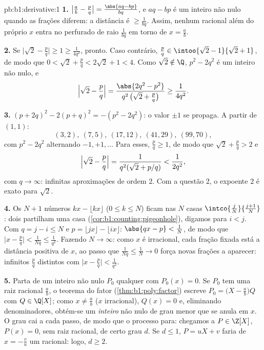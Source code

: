 \begin{solution}{pb:b1:derivative:1}
\textbf{1.} $\bigl|\frac ab - \frac pq\bigr| = \frac{\abs{aq -
bp}}{bq}$, e $aq - bp$ é um inteiro não nulo quando as frações
diferem: a distância é $\geq \frac{1}{bq}$. Assim, nenhum racional
além do próprio $x$ entra no  perfurado de raio
$\frac{1}{bq}$ em torno de $x = \frac ab$.

\textbf{2.} Se $\bigl|\sqrt2 - \frac pq\bigr| \geq 1 \geq
\frac{1}{4q^2}$, pronto. Caso contrário, $\frac pq \in \intoo{\sqrt2 -
1}{\sqrt2 + 1}$, de modo que $0 < \sqrt2 + \frac pq < 2\sqrt2 + 1 < 4$.
Como $\sqrt 2 \notin \Q$, $p^2 - 2q^2$ é um inteiro não nulo, e
\[
\Bigl|\sqrt2 - \frac pq\Bigr|
= \frac{\abs{2q^2 - p^2}}{q^2\,\bigl(\sqrt2 + \frac pq\bigr)}
\geq \frac{1}{4q^2} .
\]

\textbf{3.} $(p + 2q)^2 - 2(p + q)^2 = -(p^2 - 2q^2)$: o valor
$\pm1$ se propaga. A partir de $(1,1)$:
\[
(3,2),\ (7,5),\ (17,12),\ (41,29),\ (99,70),
\]
com $p^2 - 2q^2$ alternando $-1, +1, \dots$
Para esses, $\frac pq \geq 1$, de modo que $\sqrt2 + \frac pq > 2$ e
\[
\Bigl|\sqrt2 - \frac pq\Bigr| =
\frac{1}{q^2(\sqrt2 + p/q)} < \frac{1}{2q^2} ,
\]
com $q \to \infty$: infinitas aproximações de ordem $2$.
Com a questão 2, o expoente $2$ é exato para $\sqrt 2$.

\textbf{4.} Os $N + 1$ números $kx - \lfloor kx\rfloor$ ($0
\leq k \leq N$) ficam nas $N$ casas $\intco{\frac
jN}{\frac{j+1}{N}}$: dois partilham uma casa
(\cref{cor:b1:counting:pigeonhole}), digamos para $i < j$. Com $q =
j - i \leq N$ e $p = \lfloor jx\rfloor - \lfloor ix\rfloor$:
$\abs{qx - p} < \frac1N$, de modo que $\bigl|x - \frac pq\bigr| <
\frac{1}{Nq} \leq \frac{1}{q^2}$. Fazendo $N \to \infty$: como
$x$ é irracional, cada fração fixada está a distância positiva de
$x$, ao passo que $\frac{1}{Nq} \leq \frac 1N \to 0$ força novas
frações a aparecer: infinitos $\frac pq$ distintos com
$\bigl|x - \frac pq\bigr| < \frac{1}{q^2}$.

\textbf{5.} Parta de um inteiro não nulo $P_0$ qualquer com $P_0(x) =
0$. Se $P_0$ tem uma raiz racional $\frac ab$, o teorema do fator
(\cref{thm:b1:poly:factor}) escreve $P_0 = \bigl(X - \frac
ab\bigr)Q$ com $Q \in \Q[X]$;
como $x \neq \frac ab$ ($x$ irracional), $Q(x) = 0$ e,
eliminando denominadores, obtém-se um  \emph{inteiro} não nulo
de grau menor que se anula em $x$. O grau cai a cada
passo, de modo que o processo para: chegamos a $P \in \Z[X]$, $P(x) = 0$,
sem raiz racional, de certo grau $d$. Se $d \leq 1$, $P =
uX + v$ faria de $x = -\frac vu$ um racional: logo, $d \geq 2$.


\end{solution}
